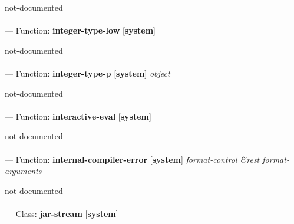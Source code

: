 \begin{adjustwidth}{5em}{5em}
not-documented
\end{adjustwidth}

\paragraph{}
\label{SYSTEM:INTEGER-TYPE-LOW}
--- Function: \textbf{integer-type-low} [\textbf{system}] \textit{}

\begin{adjustwidth}{5em}{5em}
not-documented
\end{adjustwidth}

\paragraph{}
\label{SYSTEM:INTEGER-TYPE-P}
--- Function: \textbf{integer-type-p} [\textbf{system}] \textit{object}

\begin{adjustwidth}{5em}{5em}
not-documented
\end{adjustwidth}

\paragraph{}
\label{SYSTEM:INTERACTIVE-EVAL}
--- Function: \textbf{interactive-eval} [\textbf{system}] \textit{}

\begin{adjustwidth}{5em}{5em}
not-documented
\end{adjustwidth}

\paragraph{}
\label{SYSTEM:INTERNAL-COMPILER-ERROR}
--- Function: \textbf{internal-compiler-error} [\textbf{system}] \textit{format-control \&rest format-arguments}

\begin{adjustwidth}{5em}{5em}
not-documented
\end{adjustwidth}

\paragraph{}
\label{SYSTEM:JAR-STREAM}
--- Class: \textbf{jar-stream} [\textbf{system}] \textit{}

